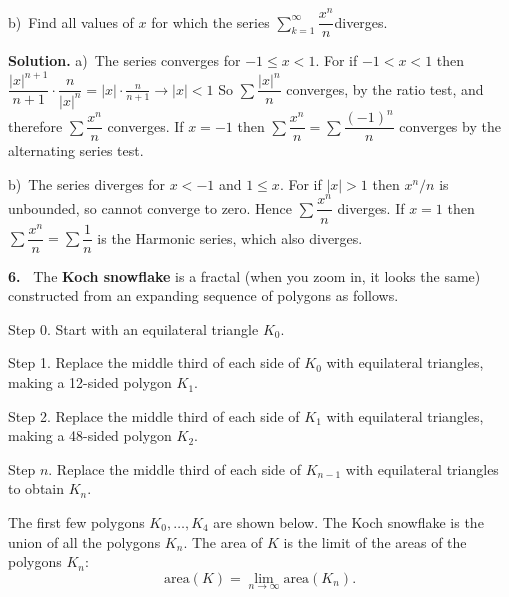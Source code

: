 \documentclass[12pt]{article}
\theoremstyle{definition}
\theoremstyle{remark}
\theoremstyle{definition}
\newenvironment{Solution}{\noindent\textbf{Solution.}}{}
\begin{document}
b)\ Find all values of $x$ for which the series $\sum\limits_{k=1}^\infty\dfrac{x^n}{n}$diverges.

\begin{Solution}
a)\ The series converges for $-1\leq x<1$. 
For if $-1<x<1$ then 
$\dfrac{|x|^{n+1}}{n+1}\cdot \dfrac{n}{|x|^n}=|x|\cdot \frac{n}{n+1}\to |x|<1$ 
So $\sum\dfrac{|x|^n}{n}$ converges, by the ratio test, and therefore $\sum\dfrac{x^n}{n}$ converges. 
If $x=-1$ then $\sum\dfrac{x^n}{n}=\sum\dfrac{(-1)^n}{n}$ converges by the alternating series test. 

b)\ The series diverges for $x<-1$ and $1\leq x$. For if $|x|>1$ then $x^n/n$ is unbounded, so cannot converge to zero. Hence $\sum\dfrac{x^n}{n}$ diverges. 
 If $x=1$ then $\sum\dfrac{x^n}{n}=\sum\dfrac{1}{n}$ is the Harmonic series, which also diverges.
 
 \end{Solution}




\newpage
{\bf 6.\ } The {\bf Koch snowflake} is a fractal (when you zoom in, it looks the same) constructed from an expanding sequence of polygons  as follows. 

Step 0. Start with an equilateral triangle $K_0$. 

Step 1. Replace the middle third of each side of $K_0$ with equilateral triangles, making a 12-sided polygon $K_1$.

Step 2. Replace the middle third of each side of $K_1$ with equilateral triangles, making a 48-sided polygon $K_2$. 

Step $n$. Replace the middle third of each side of $K_{n-1}$ with equilateral triangles to obtain $K_n$. 

The first few polygons $K_0,\dots, K_4$ are shown below. The Koch snowflake is the union of all the polygons $K_n$. The area of $K$ is the limit of the areas of the polygons $K_n$:
\[\text{area}(K)=\lim_{n\to\infty}\text{area}(K_n).\]
\end{document}
